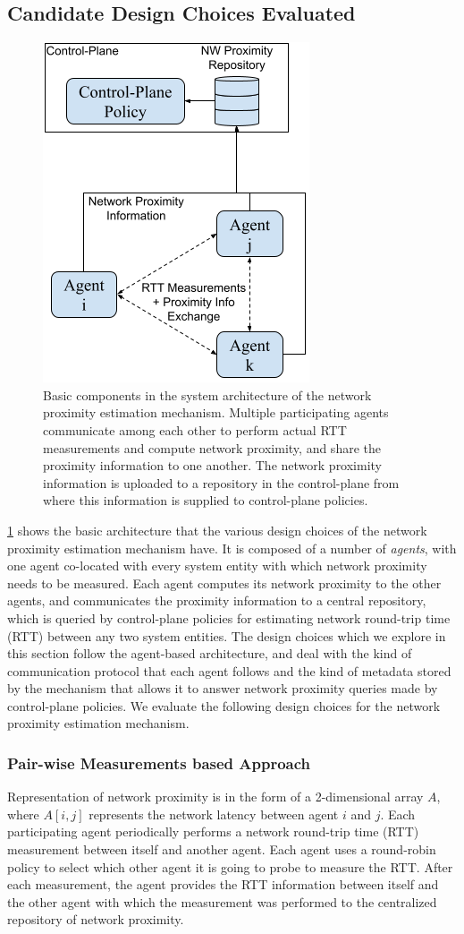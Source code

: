 \subsection{Candidate Design Choices Evaluated}
\begin{figure}
\centering
\includegraphics[width=0.4\linewidth]{figures/design_space/nw_prox/basic_sys_arch.png}
\caption{Basic components in the system architecture of the network proximity estimation mechanism. Multiple participating agents communicate among each other to perform actual RTT measurements and compute network proximity, and share the proximity information to one another. The network proximity information is uploaded to a repository in the control-plane from where this information is supplied to control-plane policies.}
\label{fig:nw_prox_arch}
\end{figure}
\cref{fig:nw_prox_arch} shows the basic architecture that the various design choices of the network proximity estimation mechanism have. It is composed of a number of \textit{agents}, with one agent co-located with every system entity with which network proximity needs to be measured. Each agent computes its network proximity to the other agents, and communicates the proximity information to a central repository, which is queried by control-plane policies for estimating network round-trip time (RTT) between any two system entities. The design choices which we explore in this section follow the agent-based architecture, and deal with the kind of communication protocol that each agent follows and the kind of metadata stored by the mechanism that allows it to answer network proximity queries made by control-plane policies. We evaluate the following design choices for the network proximity estimation mechanism. 
\subsubsection{Pair-wise Measurements based Approach}
Representation of network proximity is in the form of a 2-dimensional array $A$, where $A [ i, j ]$ represents the network latency between agent $i$ and $j$. Each participating agent periodically performs a network round-trip time (RTT) measurement between itself and another agent. Each agent uses a round-robin policy to select which other agent it is going to probe to measure the RTT. After each measurement, the agent provides the RTT information between itself and the other agent with which the measurement was performed to the centralized repository of network proximity.


